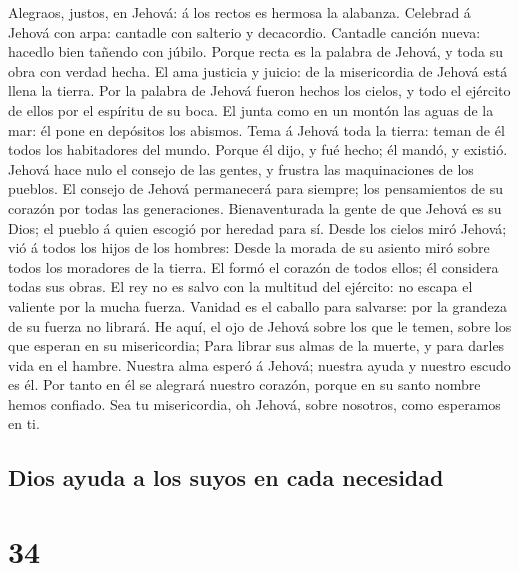  Alegraos, justos, en Jehová: á los rectos es hermosa la
alabanza.  Celebrad á Jehová con arpa: cantadle con
salterio y decacordio.  Cantadle canción nueva: hacedlo
bien tañendo con júbilo.  Porque recta es la palabra de
Jehová, y toda su obra con verdad hecha.  El ama justicia
y juicio: de la misericordia de Jehová está llena la tierra.
 Por la palabra de Jehová fueron hechos los cielos, y todo
el ejército de ellos por el espíritu de su boca.  El junta
como en un montón las aguas de la mar: él pone en depósitos los abismos.
 Tema á Jehová toda la tierra: teman de él todos los
habitadores del mundo.  Porque él dijo, y fué hecho; él
mandó, y existió.  Jehová hace nulo el consejo de las
gentes, y frustra las maquinaciones de los pueblos.  El
consejo de Jehová permanecerá para siempre; los pensamientos de su
corazón por todas las generaciones.  Bienaventurada la
gente de que Jehová es su Dios; el pueblo á quien escogió por heredad
para sí.  Desde los cielos miró Jehová; vió á todos los
hijos de los hombres:  Desde la morada de su asiento miró
sobre todos los moradores de la tierra.  El formó el
corazón de todos ellos; él considera todas sus obras.  El
rey no es salvo con la multitud del ejército: no escapa el valiente por
la mucha fuerza.  Vanidad es el caballo para salvarse:
por la grandeza de su fuerza no librará.  He aquí, el ojo
de Jehová sobre los que le temen, sobre los que esperan en su
misericordia;  Para librar sus almas de la muerte, y para
darles vida en el hambre.  Nuestra alma esperó á Jehová;
nuestra ayuda y nuestro escudo es él.  Por tanto en él se
alegrará nuestro corazón, porque en su santo nombre hemos confiado.
 Sea tu misericordia, oh Jehová, sobre nosotros, como
esperamos en ti.

\hypertarget{dios-ayuda-a-los-suyos-en-cada-necesidad}{%
\subsection{Dios ayuda a los suyos en cada
necesidad}\label{dios-ayuda-a-los-suyos-en-cada-necesidad}}

\hypertarget{section-33}{%
\section{34}\label{section-33}}

